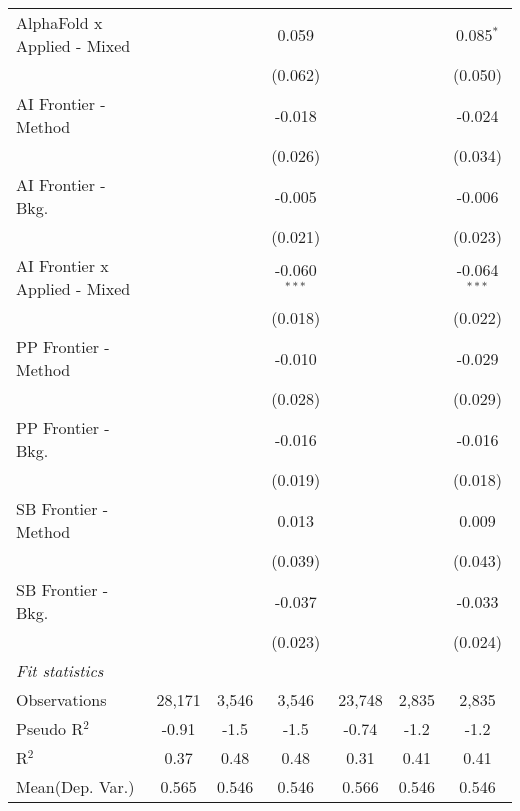 \begin{tabular}{lcccccc}
   AlphaFold x Applied - Mixed   &                &               & 0.059          &                &         & 0.085$^{*}$\\   
                                 &                &               & (0.062)        &                &         & (0.050)\\   
   AI Frontier - Method          &                &               & -0.018         &                &         & -0.024\\   
                                 &                &               & (0.026)        &                &         & (0.034)\\   
   AI Frontier - Bkg.            &                &               & -0.005         &                &         & -0.006\\   
                                 &                &               & (0.021)        &                &         & (0.023)\\   
   AI Frontier x Applied - Mixed &                &               & -0.060$^{***}$ &                &         & -0.064$^{***}$\\   
                                 &                &               & (0.018)        &                &         & (0.022)\\   
   PP Frontier - Method          &                &               & -0.010         &                &         & -0.029\\   
                                 &                &               & (0.028)        &                &         & (0.029)\\   
   PP Frontier - Bkg.            &                &               & -0.016         &                &         & -0.016\\   
                                 &                &               & (0.019)        &                &         & (0.018)\\   
   SB Frontier - Method          &                &               & 0.013          &                &         & 0.009\\   
                                 &                &               & (0.039)        &                &         & (0.043)\\   
   SB Frontier - Bkg.            &                &               & -0.037         &                &         & -0.033\\   
                                 &                &               & (0.023)        &                &         & (0.024)\\   
   \midrule
   \emph{Fit statistics}\\
   Observations                  & 28,171         & 3,546         & 3,546          & 23,748         & 2,835   & 2,835\\  
   Pseudo R$^2$                  & -0.91          & -1.5          & -1.5           & -0.74          & -1.2    & -1.2\\  
   R$^2$                         & 0.37           & 0.48          & 0.48           & 0.31           & 0.41    & 0.41\\  
Mean(Dep. Var.) & 0.565 & 0.546 & 0.546 & 0.566 & 0.546 & 0.546 \\
   

\end{tabular}
